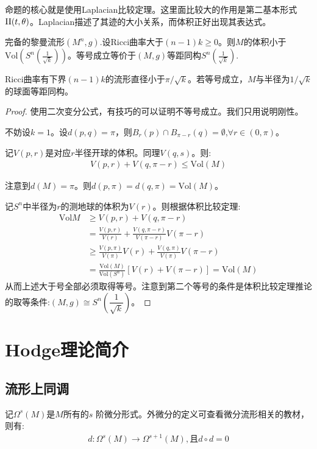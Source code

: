 命题的核心就是使用Laplacian比较定理。这里面比较大的作用是第二基本形式$\mathrm{II}(t,\theta)$。Laplacian描述了其迹的大小关系，而体积正好出现其表达式。

\begin{corollary}
    完备的黎曼流形$(M^n,g)$.设Ricci曲率大于$(n-1)k\geq 0$。则$M$的体积小于$\mathrm{Vol}(S^n(\frac{1}{\sqrt{k}}))$。等号成立等价于$(M,g)$等距同构$S^n(\frac{1}{\sqrt{k}})$.
\end{corollary}
\begin{theorem}[最大直径定理]
    Ricci曲率有下界$(n-1)k$的流形直径小于$\pi/\sqrt{k}$。若等号成立，$M$与半径为$1/\sqrt{k}$的球面等距同构。
\end{theorem}
\begin{proof}
    使用二次变分公式，有技巧的可以证明不等号成立。我们只用说明刚性。
    
    不妨设$k=1$。设$d(p,q)=\pi$，则$B_r(p)\cap B_{\pi-r}(q)=\emptyset$,$\forall r \in (0,\pi)$。

    记$V(p,r)$是对应$r$半径开球的体积。同理$V(q,s)$。则:
    \begin{align*}
        V(p,r)+V(q,\pi-r)\leq \mathrm{Vol}(M)
    \end{align*}

    注意到$d(M)=\pi$。则$d(p,\pi)=d(q,\pi)=\mathrm{Vol}(M)$。

    记$S^n$中半径为$r$的测地球的体积为$V(r)$。则根据体积比较定理:
    \begin{align*}
        \mathrm{Vol}M & \geq V(p,r)+V(q,\pi-r) \\&=\frac{V(p,r)}{V(r)}+\frac{V(q,\pi-r)}{V(\pi-r)}V(\pi-r)\\ &\geq \frac{V(p,\pi)}{V(\pi)}V(r)+\frac{V(q,\pi)}{V(\pi)}V(\pi-r)\\&=\frac{\mathrm{Vol}(M)}{\mathrm{Vol}(S^n)}[V(r)+V(\pi-r)]=\mathrm{Vol}(M)
    \end{align*}
    从而上述大于号全部必须取得等号。注意到第二个等号的条件是体积比较定理推论的取等条件:$(M,g)\cong S^n(\dfrac{1}{\sqrt{k}})$。
\end{proof}
\chapter{Hodge理论简介}
\section{流形上同调}
记$\Omega^s(M)$是$M$所有的$s$ 
阶微分形式。外微分的定义可查看微分流形相关的教材，则有:
\begin{align*}
    d:\Omega^s(M)\to \Omega^{s+1}(M),\text{且}d \circ d=0
\end{align*}

